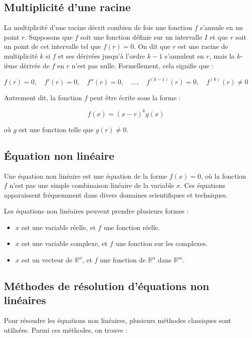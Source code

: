 \documentclass{article}
\begin{document}
\subsection{Multiplicité d'une racine}
La multiplicité d'une racine décrit combien de fois une fonction $f$ s'annule en un point $r$. Supposons que $f$ soit une fonction définie sur un intervalle $I$ et que $r$ soit un point de cet intervalle tel que $f(r) = 0$. On dit que $r$ est une racine de multiplicité $k$ si $f$ et ses dérivées jusqu'à l'ordre $k-1$ s'annulent en $r$, mais la $k$-ième dérivée de $f$ en $r$ n'est pas nulle. Formellement, cela signifie que :

\[
f(r) = 0, \quad f'(r) = 0, \quad f''(r) = 0, \quad \ldots, \quad f^{(k-1)}(r) = 0, \quad f^{(k)}(r) \neq 0
\]

Autrement dit, la fonction $f$ peut être écrite sous la forme :

\[
f(x) = (x - r)^k g(x)
\]

où $g$ est une fonction telle que $g(r) \neq 0$.

\subsection{Équation non linéaire}
Une équation non linéaire est une équation de la forme $f(x) = 0$, où la fonction $f$ n'est pas une simple combinaison linéaire de la variable $x$. Ces équations apparaissent fréquemment dans divers domaines scientifiques et techniques.

Les équations non linéaires peuvent prendre plusieurs formes :
\begin{itemize}
    \item $x$ est une variable réelle, et $f$ une fonction réelle.
    \item $x$ est une variable complexe, et $f$ une fonction sur les complexes.
    \item $x$ est un vecteur de $\mathbb{R}^n$, et $f$ une fonction de $\mathbb{R}^n$ dans $\mathbb{R}^m$.
\end{itemize}

\subsection{Méthodes de résolution d'équations non linéaires}
Pour résoudre les équations non linéaires, plusieurs méthodes classiques sont utilisées. Parmi ces méthodes, on trouve :
\end{document}
